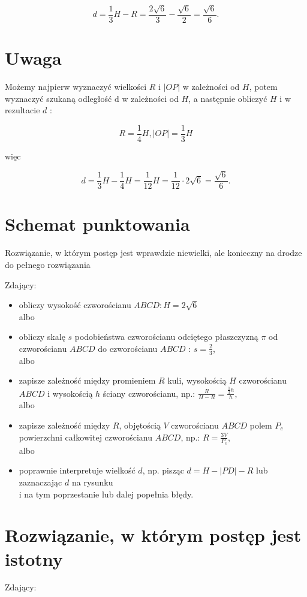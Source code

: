 \documentclass[10pt]{article}
\begin{document}
$$
d=\frac{1}{3} H-R=\frac{2 \sqrt{6}}{3}-\frac{\sqrt{6}}{2}=\frac{\sqrt{6}}{6} .
$$

\section*{Uwaga}
Możemy najpierw wyznaczyć wielkości $R$ i $|O P|$ w zależności od $H$, potem wyznaczyć szukaną odległość d w zależności od $H$, a następnie obliczyć $H$ i w rezultacie $d$ :

$$
R=\frac{1}{4} H,|O P|=\frac{1}{3} H
$$

więc

$$
d=\frac{1}{3} H-\frac{1}{4} H=\frac{1}{12} H=\frac{1}{12} \cdot 2 \sqrt{6}=\frac{\sqrt{6}}{6} .
$$

\section*{Schemat punktowania}
Rozwiązanie, w którym postęp jest wprawdzie niewielki, ale konieczny na drodze do pełnego rozwiązania

Zdający:

\begin{itemize}
  \item obliczy wysokość czworościanu $A B C D: H=2 \sqrt{6}$\\
albo
  \item obliczy skalę $s$ podobieństwa czworościanu odciętego płaszczyzną $\pi$ od czworościanu $A B C D$ do czworościanu $A B C D$ : $s=\frac{2}{3}$,\\
albo
  \item zapisze zależność między promieniem $R$ kuli, wysokością $H$ czworościanu $A B C D$ i wysokością $h$ ściany czworościanu, np.: $\frac{R}{H-R}=\frac{\frac{1}{3} h}{h}$,\\
albo
  \item zapisze zależność między $R$, objętością $V$ czworościanu $A B C D$ polem $P_{c}$ powierzchni całkowitej czworościanu $A B C D$, np.: $R=\frac{3 V}{P_{c}}$,\\
albo
  \item poprawnie interpretuje wielkość $d$, np. pisząc $d=H-|P D|-R$ lub zaznaczając $d$ na rysunku\\
i na tym poprzestanie lub dalej popełnia błędy.
\end{itemize}

\section*{Rozwiązanie, w którym postęp jest istotny}
Zdający:
\end{document}
